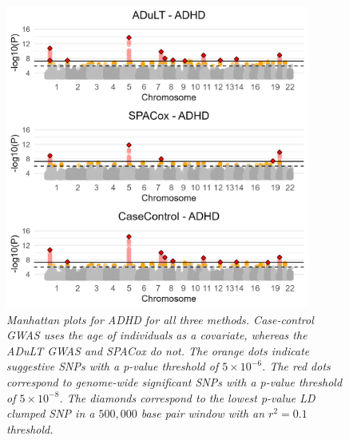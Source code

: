 \begin{figure}[h] 
	\centering
	\includegraphics[width=10cm]{results/adult_manhattanPlot_ADHD}
	\caption[Manhattan plots from GWAS with the ADuLT phenotype, SPACox, and case-control status for ADHD]{
		\sl Manhattan plots for ADHD for all three methods. Case-control GWAS uses the age of individuals as a covariate, whereas the ADuLT GWAS and SPACox do not. The orange dots indicate suggestive SNPs with a p-value threshold of $ 5 \times 10^{-6} $. The red dots correspond to genome-wide significant SNPs with a p-value threshold of $ 5 \times 10^{-8} $. The diamonds correspond to the lowest p-value LD clumped SNP in a $ 500,000 $ base pair window with an $ r^2 = 0.1 $ threshold.}
	\label{fig:adult_ADHD}
\end{figure}

